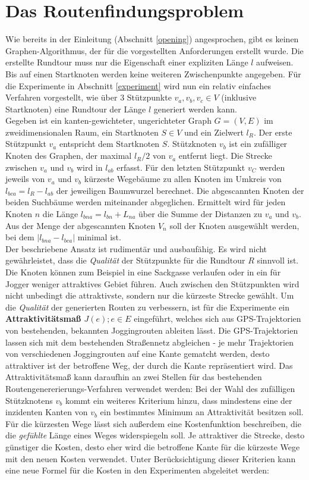 \documentclass[12pt]{article}
\begin{document}
\section{Das Routenfindungsproblem}\label{routing}
Wie bereits in der Einleitung (Abschnitt \ref{opening}) angesprochen, gibt es keinen Graphen-Algorithmus, der für die vorgestellten Anforderungen erstellt wurde. Die erstellte Rundtour muss nur die Eigenschaft einer expliziten Länge $l$ aufweisen. Bis auf einen Startknoten werden keine weiteren Zwischenpunkte angegeben. Für die Experimente in Abschnitt \ref{experiment} wird nun ein relativ einfaches Verfahren vorgestellt, wie über 3 Stützpunkte $v_{a}, v_{b}, v_{c} \in V$ (inklusive Startknoten) eine Rundtour der Länge $l$ generiert werden kann.\\
Gegeben ist ein kanten-gewichteter, ungerichteter Graph $G = (V,E)$ im zweidimensionalen Raum, ein Startknoten $S \in V$ und ein Zielwert $l_{R}$. Der erste Stützpunkt $v_a$ entspricht dem Startknoten $S$. Stützknoten $v_{b}$ ist ein zufälliger Knoten des Graphen, der maximal $l_{R}/2$ von $v_a$ entfernt liegt. Die Strecke zwischen $v_{a}$ und $v_b$ wird in $l_{ab}$ erfasst. Für den letzten Stützpunkt $v_{C}$ werden jeweils von $v_{a}$ und $v_{b}$ kürzeste Wegebäume zu allen Knoten im Umkreis von $l_{bca} = l_{R} - l_{ab}$ der jeweiligen Baumwurzel berechnet. Die abgescannten Knoten der beiden Suchbäume werden miteinander abgeglichen. Ermittelt wird für jeden Knoten $n$ die Länge $l_{bna} = l_{bn} + L_{na}$ über die Summe der Distanzen zu $v_{a}$ und $v_{b}$. Aus der Menge der abgescannten Knoten $V_{n}$ soll der Knoten ausgewählt werden, bei dem $|l_{bna} - l_{bca}|$ minimal ist.\\
Der beschriebene Ansatz ist rudimentär und ausbaufähig. Es wird nicht gewährleistet, dass die \textit{Qualität} der Stützpunkte für die Rundtour $R$ sinnvoll ist. Die Knoten können zum Beispiel in eine Sackgasse verlaufen oder in ein für Jogger weniger attraktives Gebiet führen. Auch zwischen den Stützpunkten wird nicht unbedingt die attraktivste, sondern nur die kürzeste Strecke gewählt. Um die \textit{Qualität} der generierten Routen zu verbessern, ist für die Experimente ein \textbf{Attraktivitätsmaß $J(e); e \in E$} eingeführt, welches sich aus GPS-Trajektorien von bestehenden, bekannten Joggingrouten ableiten lässt. Die GPS-Trajektorien lassen sich mit dem bestehenden Straßennetz abgleichen - je mehr Trajektorien von verschiedenen Joggingrouten auf eine Kante gematcht werden, desto attraktiver ist der betroffene Weg, der durch die Kante repräsentiert wird. Das Attraktivitätsmaß kann daraufhin an zwei Stellen für das bestehenden Routengenererierungs-Verfahren verwendet werden: Bei der Wahl des zufälligen Stützknotens $v_{b}$ kommt ein weiteres Kriterium hinzu, dass mindestens eine der inzidenten Kanten von $v_{b}$ ein bestimmtes Minimum an Attraktivität besitzen soll. Für die kürzesten Wege lässt sich außerdem eine Kostenfunktion  beschreiben, die die \textit{gefühlte} Länge eines Weges widerspiegeln soll. Je attraktiver die Strecke, desto günstiger die Kosten, desto eher wird die betroffene Kante für die kürzeste Wege mit den neuen Kosten verwendet. Unter Berücksichtigung dieser Kriterien kann eine neue Formel für die Kosten in den Experimenten abgeleitet werden:
\end{document}
